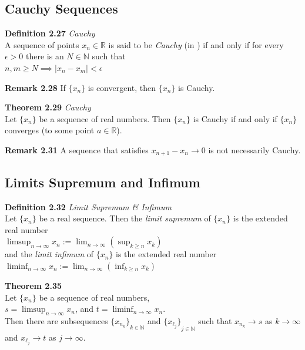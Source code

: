 \documentclass[8pt,landscape]{article}
\begin{document}
\begin{multicols}{3}
    \subsection{Cauchy Sequences}



    \textbf{Definition 2.27} \emph{Cauchy} \\
    A sequence of points $x_n \in \mathbb{R}$ is said to be \emph{Cauchy} (in )
    if and only if for every $\epsilon > 0$ there is an $N \in \mathbb{N}$ such that \\
    $n, m \geq N \implies |x_n - x_m| < \epsilon$

    \textbf{Remark 2.28}
    If $\{x_n\}$ is convergent, then $\{x_n\}$ is Cauchy.

    \textbf{Theorem 2.29} \emph{Cauchy} \\
    Let $\{x_n\}$ be a sequence of real numbers.
    Then $\{x_n\}$ is Cauchy if and only if $\{x_n\}$ converges
    (to some point $a \in \mathbb{R}$).

    \textbf{Remark 2.31}
    A sequence that satisfies $x_{n+1} - x_n \to 0$ is not necessarily Cauchy.


    \subsection{Limits Supremum and Infimum}



    \textbf{Definition 2.32} \emph{Limit Supremum \& Infimum} \\
    Let $\{x_n\}$ be a real sequence.
    Then the \emph{limit supremum} of $\{x_n\}$ is the extended real number \\
    $\limsup_{n \to \infty} x_n := \lim_{n \to \infty} (\sup_{k \geq n} x_k)$ \\
    and the \emph{limit infimum} of $\{x_n\}$ is the extended real number \\
    $\liminf_{n \to \infty} x_n := \lim_{n \to \infty} (\inf_{k \geq n} x_k)$

    \textbf{Theorem 2.35} \\
    Let $\{x_n\}$ be a sequence of real numbers, \\
    $s = \limsup_{n \to \infty} x_n$,
    and $t = \liminf_{n \to \infty} x_n$. \\
    Then there are subsequences ${\{x_n_k\}}_{k \in \mathbb{N}}$ and
    ${\{x_\ell_j\}}_{j \in \mathbb{N}}$ such that
    $x_n_k \to s$ as $k \to \infty$ and $x_\ell_j \to t$ as $j \to \infty$.



\end{multicols}
\end{document}
